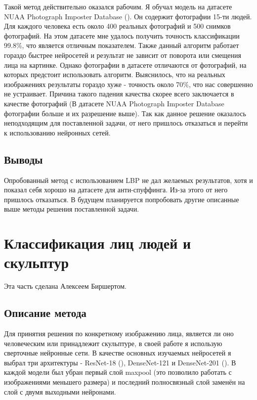 \documentclass[a4paper,14pt]{extarticle}
\begin{document}
    \par Такой метод действительно оказался рабочим. Я обучал модель на датасете NUAA Photograph Imposter Database (\cite{NUAA}). Он содержит фотографии 15-ти людей. Для каждого человека есть около 400 реальных фотографий и 500 снимков фотографий. На этом датасете мне удалось получить точность классификации 99.8\%, что является отличным показателем. Также данный алгоритм работает гораздо быстрее нейросетей и результат не зависит от поворота или смещения лица на картинке. Однако фотографии в датасете отличаются от фотографий, на которых предстоит использовать алгоритм. Выяснилось, что на реальных изображениях результаты гораздо хуже - точность около 70\%, что нас совершенно не устраивает. Причина такого падения качества скорее всего заключается в качестве фотографий (В датасете NUAA Photograph Imposter Database фотографии больше и их разрешение выше). Так как данное решение оказалось неподходящим для поставленной задачи, от него пришлось отказаться и перейти к использованию нейронных сетей.
    \subsection{Выводы}
    Опробованный метод с использованием LBP не дал желаемых результатов, хотя и показал себя хорошо на датасете для анти-спуффинга. Из-за этого от него пришлось отказаться. В будущем планируется попробовать другие описанные выше методы решения поставленной задачи.
    \newpage

    \section{Классификация лиц людей и скульптур}
    Эта часть сделана Алексеем Биршертом.
    \subsection{Описание метода}
    Для принятия решения по конкретному изображению лица, является ли оно человеческим или принадлежит скульптуре, в своей работе я использую сверточные нейронные сети. В качестве основных изучаемых нейросетей я выбрал три архитектуры - ResNet-18 (\cite{resnet}), DenseNet-121 и DenseNet-201 (\cite{densenet}). В каждой модели был убран первый слой maxpool (это позволило работать с изображениями меньшего размера) и последний полносвязный слой заменён на слой с двумя выходными нейронами.
\end{document}
